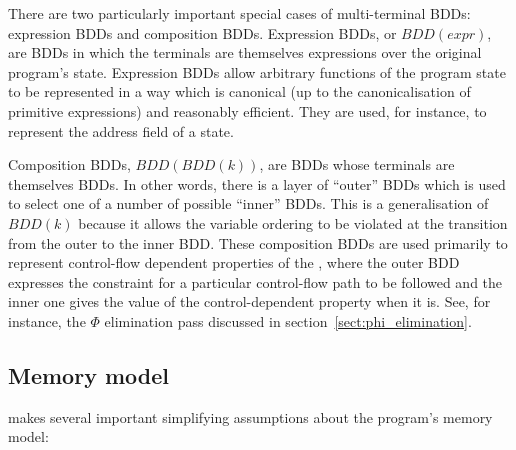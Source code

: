 There are two particularly important special cases of multi-terminal
BDDs: expression BDDs and composition BDDs.  Expression BDDs, or
$BDD(expr)$, are BDDs in which the terminals are themselves
expressions over the original program's state.  Expression BDDs allow
arbitrary functions of the program state to be represented in a way
which is canonical (up to the canonicalisation of primitive
expressions) and reasonably efficient.  They are used, for instance,
to represent the address field of a {\StateMachine} 
state.

Composition BDDs, $BDD(BDD(k))$, are BDDs whose terminals are
themselves BDDs.  In other words, there is a layer of ``outer'' BDDs
which is used to select one of a number of possible ``inner'' BDDs.
This is a generalisation of $BDD(k)$ because it allows the variable
ordering to be violated at the transition from the outer to the inner
BDD.  These composition BDDs are used primarily to represent
control-flow dependent properties of the {\StateMachine}, where the
outer BDD expresses the constraint for a particular control-flow path
to be followed and the inner one gives the value of the
control-dependent property when it is.  See, for instance, the $\Phi$
elimination pass discussed in section~\ref{sect:phi_elimination}.



\subsection{Memory model}

{\Technique} makes several important simplifying assumptions about the
program's memory model:

